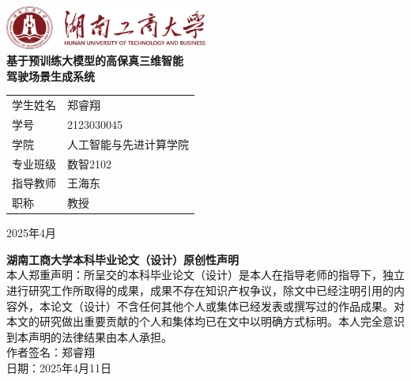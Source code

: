 \documentclass{article}
\begin{document}
\begin{titlepage}
    \centering
    \vspace*{0.5cm}  %
   \includegraphics[width=0.5\textwidth]{picture/logo.png}
    \\  %
    \vspace{1.5cm} %
    \textbf{\LARGE 基于预训练大模型的高保真三维智能\\驾驶场景生成系统} \\[1.5em]
    \begin{tabular}{@{}ll@{}}
        学生姓名 & 郑睿翔 \\[1em]
        学号 & 2123030045 \\[1em]
        学院 & 人工智能与先进计算学院 \\[1em]
        专业班级 & 数智2102 \\[1em]
        指导教师 & 王海东 \\[1em]
        职称 & 教授 \\[1em]
    \end{tabular}
    \vspace{2cm} %
    \vfill  %
    \begin{center}
        2025年4月
    \end{center}
\end{titlepage}

\newpage
\begin{titlepage}
    \centering
    \vspace*{2cm}
    \textbf{\LARGE 湖南工商大学本科毕业论文（设计）原创性声明}\\[2em]
    本人郑重声明：所呈交的本科毕业论文（设计）是本人在指导老师的指导下，独立进行研究工作所取得的成果，成果不存在知识产权争议，除文中已经注明引用的内容外，本论文（设计）不含任何其他个人或集体已经发表或撰写过的作品成果。对本文的研究做出重要贡献的个人和集体均已在文中以明确方式标明。本人完全意识到本声明的法律结果由本人承担。\\[2em]
    作者签名：郑睿翔\\[1em]
    日期：2025年4月11日
\end{titlepage}
\end{document}
